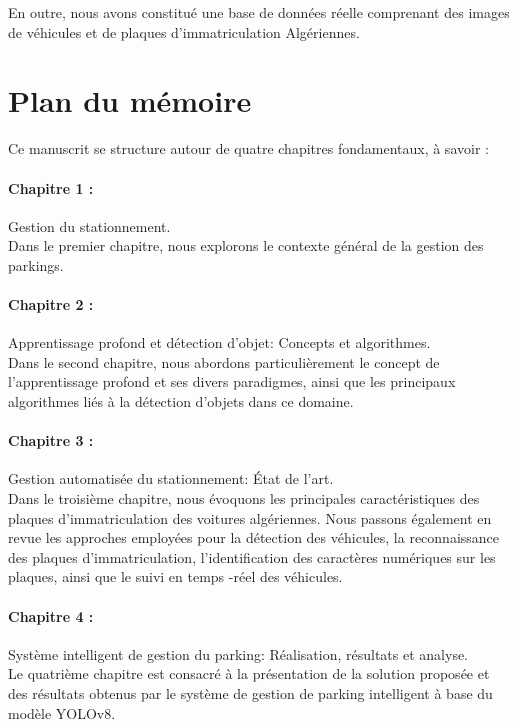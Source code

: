 En outre, nous avons constitué une base de données réelle comprenant des images de véhicules et de plaques d'immatriculation Algériennes.

\section*{Plan du mémoire}
Ce manuscrit se structure autour de quatre chapitres fondamentaux, à savoir :

\paragraph{Chapitre 1 :}
Gestion du stationnement.\\
 Dans le premier chapitre, nous explorons le contexte général de la gestion des parkings.

\paragraph{Chapitre 2 :}
Apprentissage profond et détection d'objet: Concepts et algorithmes.\\
Dans le second chapitre, nous abordons particulièrement le concept de l'apprentissage profond et ses divers paradigmes, ainsi que les principaux algorithmes liés à la détection d'objets dans ce domaine.

\paragraph{Chapitre 3 :}
Gestion automatisée du stationnement: État de l'art.\\
Dans le troisième chapitre, nous évoquons les principales caractéristiques des plaques d'immatriculation des voitures algériennes. Nous passons également en revue les approches employées pour la détection des véhicules, la reconnaissance des plaques d'immatriculation, l'identification des caractères numériques sur les plaques, ainsi que le suivi en temps -réel des véhicules.

\paragraph{Chapitre 4 :}
Système intelligent de gestion du parking: Réalisation, résultats et analyse.\\
Le quatrième chapitre est consacré à la présentation de la solution proposée et des résultats obtenus par le système de gestion de parking intelligent à base du modèle YOLOv8.